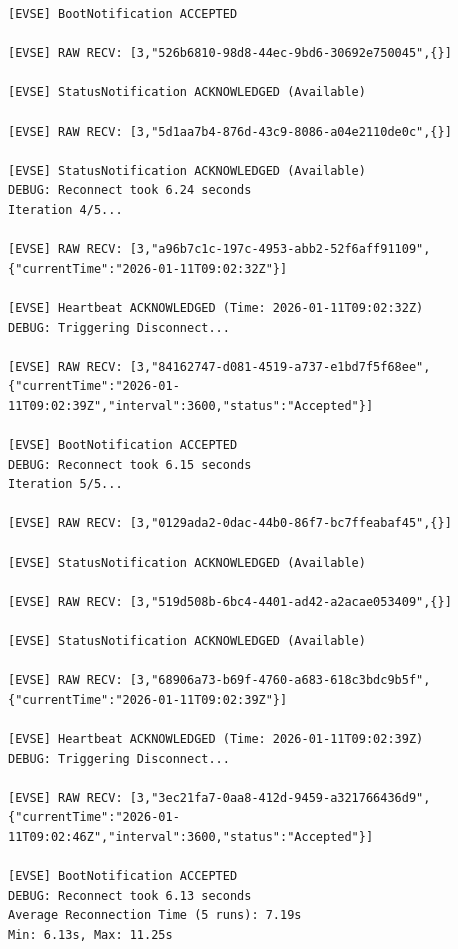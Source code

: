 \documentclass{article}
\begin{document}
\begin{lstlisting}
[EVSE] BootNotification ACCEPTED

[EVSE] RAW RECV: [3,"526b6810-98d8-44ec-9bd6-30692e750045",{}]

[EVSE] StatusNotification ACKNOWLEDGED (Available)

[EVSE] RAW RECV: [3,"5d1aa7b4-876d-43c9-8086-a04e2110de0c",{}]

[EVSE] StatusNotification ACKNOWLEDGED (Available)
DEBUG: Reconnect took 6.24 seconds
Iteration 4/5...

[EVSE] RAW RECV: [3,"a96b7c1c-197c-4953-abb2-52f6aff91109",{"currentTime":"2026-01-11T09:02:32Z"}]

[EVSE] Heartbeat ACKNOWLEDGED (Time: 2026-01-11T09:02:32Z)
DEBUG: Triggering Disconnect...

[EVSE] RAW RECV: [3,"84162747-d081-4519-a737-e1bd7f5f68ee",{"currentTime":"2026-01-11T09:02:39Z","interval":3600,"status":"Accepted"}]

[EVSE] BootNotification ACCEPTED
DEBUG: Reconnect took 6.15 seconds
Iteration 5/5...

[EVSE] RAW RECV: [3,"0129ada2-0dac-44b0-86f7-bc7ffeabaf45",{}]

[EVSE] StatusNotification ACKNOWLEDGED (Available)

[EVSE] RAW RECV: [3,"519d508b-6bc4-4401-ad42-a2acae053409",{}]

[EVSE] StatusNotification ACKNOWLEDGED (Available)

[EVSE] RAW RECV: [3,"68906a73-b69f-4760-a683-618c3bdc9b5f",{"currentTime":"2026-01-11T09:02:39Z"}]

[EVSE] Heartbeat ACKNOWLEDGED (Time: 2026-01-11T09:02:39Z)
DEBUG: Triggering Disconnect...

[EVSE] RAW RECV: [3,"3ec21fa7-0aa8-412d-9459-a321766436d9",{"currentTime":"2026-01-11T09:02:46Z","interval":3600,"status":"Accepted"}]

[EVSE] BootNotification ACCEPTED
DEBUG: Reconnect took 6.13 seconds
Average Reconnection Time (5 runs): 7.19s
Min: 6.13s, Max: 11.25s
\end{lstlisting}
\end{document}
